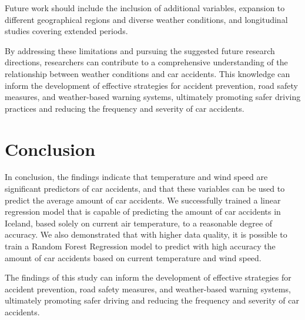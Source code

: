 \documentclass{article}
\begin{document}
Future work should include the inclusion of additional variables, expansion to different geographical regions and diverse weather conditions, and longitudinal studies covering extended periods.

By addressing these limitations and pursuing the suggested future research directions, researchers can contribute to a comprehensive understanding of the relationship between weather conditions and car accidents. This knowledge can inform the development of effective strategies for accident prevention, road safety measures, and weather-based warning systems, ultimately promoting safer driving practices and reducing the frequency and severity of car accidents.


\section{Conclusion}

In conclusion, the findings indicate that temperature and wind speed are significant predictors of car accidents, and that these variables can be used to predict the average amount of car accidents. We successfully trained a linear regression model that is capable of predicting the amount of car accidents in Iceland, based solely on current air temperature, to a reasonable degree of accuracy. We also demonstrated that with higher data quality, it is possible to train a Random Forest Regression model to predict with high accuracy the amount of car accidents based on current temperature and wind speed.

The findings of this study can inform the development of effective strategies for accident prevention, road safety measures, and weather-based warning systems, ultimately promoting safer driving and reducing the frequency and severity of car accidents.

\newpage


\end{document}
